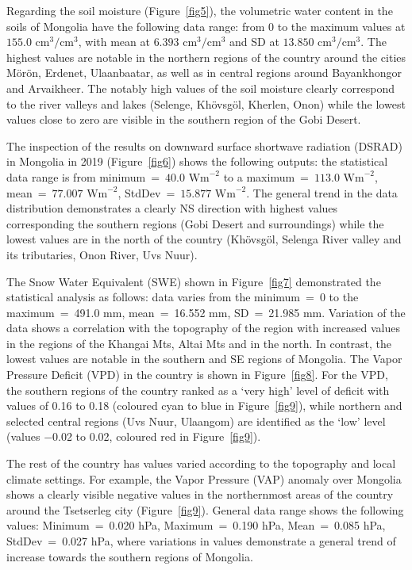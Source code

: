 \documentclass[geosciences,article,accept,pdftex,oneauthor]{Definitions/mdpi}
\begin{document}
Regarding the soil moisture (Figure~\ref{fig5}), the volumetric water content in the soils of Mongolia have the following data range: from 0 to the maximum values at $155.0$ $\text{cm}^3/\text{cm}^3$, with mean at $6.393$ $\text{cm}^3/\text{cm}^3$ and SD at $13.850$ $\text{cm}^3/\text{cm}^3$. The highest values are notable in the northern regions of the country around the cities Mörön, Erdenet, Ulaanbaatar, as well as in central regions around Bayankhongor and Arvaikheer. The notably high values of the soil moisture clearly correspond to the river valleys and lakes (Selenge, Khövsgöl, Kherlen, Onon) while the lowest values close to zero are visible in the southern region of the Gobi Desert. 

The inspection of the results on downward surface shortwave radiation (DSRAD) in Mongolia in 2019 (Figure~\ref{fig6}) shows the following outputs: the statistical data range is from minimum~=~$40.0$ $\text{Wm}^{-2}$ to a maximum~=~$113.0$ $\text{Wm}^{-2}$, mean~=~$77.007$ $\text{Wm}^{-2}$, StdDev~=~$15.877$ $\text{Wm}^{-2}$. The general trend in the data distribution demonstrates a clearly NS direction with highest values corresponding the southern regions (Gobi Desert and surroundings) while the lowest values are in the north of the country (Khövsgöl, Selenga River valley and its tributaries, Onon River, Uvs Nuur).

The Snow Water Equivalent (SWE) shown in Figure~\ref{fig7} demonstrated the statistical analysis as follows: data varies from the minimum~=~0 to the maximum~=~491.0 mm, mean~=~16.552 mm, SD~=~21.985 mm. Variation of the data shows a correlation with the topography of the region with increased values in the regions of the Khangai Mts, Altai Mts and in the north. In contrast, the lowest values are notable in the southern and SE regions of Mongolia. The Vapor Pressure Deficit (VPD) in the country is shown in Figure~\ref{fig8}. For the VPD, the southern regions of the country ranked as a ‘very high’ level of deficit with values of 0.16 to 0.18 (coloured cyan to blue in Figure~\ref{fig9}), while northern and selected central regions (Uvs Nuur, Ulaangom) are identified as the ‘low’ level (values $-$0.02 to 0.02, coloured red in Figure~\ref{fig9}). 




The rest of the country has values varied according to the topography and local climate settings. For example, the Vapor Pressure (VAP) anomaly over Mongolia shows a clearly visible negative values in the northernmost areas of the country around the Tsetserleg city (Figure~\ref{fig9}). General data range shows the following values: Minimum~=~0.020 hPa, Maximum~=~0.190 hPa, Mean~=~0.085 hPa, StdDev~=~0.027 hPa, where variations in values demonstrate a general trend of increase towards the southern regions of Mongolia. 
\end{document}
